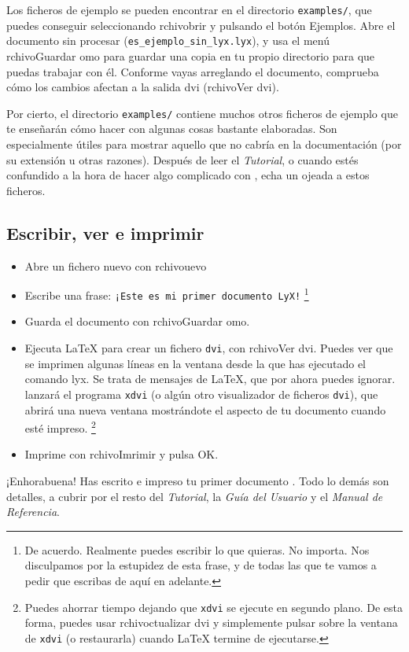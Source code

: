 Los ficheros de ejemplo se pueden encontrar en el directorio \texttt{examples/},
que puedes conseguir seleccionando \textsf{}\textsf{rchivo\lyxarrow{}}\textsf{}\textsf{brir}
y pulsando el botón \textsf{Ejemplos}. Abre el documento sin procesar
(\texttt{es\_ejemplo\_sin\_lyx.lyx}), y usa el menú \textsf{}\textsf{rchivo\lyxarrow{}Guardar}
\textsf{}\textsf{omo} para guardar una copia en tu propio
directorio para que puedas trabajar con él. Conforme vayas arreglando
el documento, comprueba cómo los cambios afectan a la salida dvi (\textsf{}\textsf{rchivo\lyxarrow{}Ver
dvi}).

Por cierto, el directorio \texttt{examples/} contiene muchos otros
ficheros de ejemplo que te enseñarán cómo hacer con \LyX{} algunas
cosas bastante elaboradas. Son especialmente útiles para mostrar aquello
que no cabría en la documentación (por su extensión u otras razones).
Después de leer el \emph{Tutorial}, o cuando estés confundido a la
hora de hacer algo complicado con \LyX{}, echa un ojeada a estos ficheros.


\subsection{Escribir, ver e imprimir}

\begin{itemize}
\item Abre un fichero nuevo con \textsf{}\textsf{rchivo\lyxarrow{}}\textsf{}\textsf{uevo}
\item Escribe una frase: \texttt{¡Este es mi primer documento LyX!}%
\footnote{De acuerdo. Realmente puedes escribir lo que quieras. No importa.
Nos disculpamos por la estupidez de esta frase, y de todas las que
te vamos a pedir que escribas de aquí en adelante.%
}
\item Guarda el documento con \textsf{}\textsf{rchivo\lyxarrow{}Guardar}
\textsf{}\textsf{omo\@.}
\item Ejecuta \LaTeX{} para crear un fichero \texttt{dvi}, con \textsf{}\textsf{rchivo\lyxarrow{}Ver
dvi}\@. Puedes ver que se imprimen algunas líneas en la ventana desde
la que has ejecutado el comando lyx. Se trata de mensajes de \LaTeX{},
que por ahora puedes ignorar. \LyX{} lanzará el programa \texttt{xdvi}
(o algún otro visualizador de ficheros \texttt{dvi}), que abrirá una
nueva ventana mostrándote el aspecto de tu documento cuando esté impreso.%
\footnote{Puedes ahorrar tiempo dejando que \texttt{xdvi} se ejecute en segundo
plano. De esta forma, puedes usar \textsf{}\textsf{rchivo\lyxarrow{}ctualizar
dvi} y simplemente pulsar sobre la ventana de \texttt{xdvi} (o restaurarla)
cuando \LaTeX{} termine de ejecutarse.%
}
\item Imprime con \textsf{}\textsf{}\textsf{rchivo\lyxarrow{}Im}\textsf{}\textsf{rimir}
y pulsa \textsf{OK\@.}
\end{itemize}
¡Enhorabuena! Has escrito e impreso tu primer documento \LyX{}. Todo
lo demás son detalles, a cubrir por el resto del \emph{Tutorial},
la \emph{Guía del Usuario} y el \emph{Manual de Referencia}.


